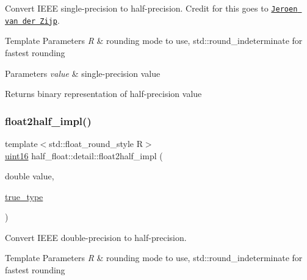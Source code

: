 Convert I\+E\+EE single-\/precision to half-\/precision. Credit for this goes to \href{ftp://ftp.fox-toolkit.org/pub/fasthalffloatconversion.pdf}{\tt Jeroen van der Zijp}. 
\begin{DoxyTemplParams}{Template Parameters}
{\em R} & rounding mode to use, {\ttfamily std\+::round\+\_\+indeterminate} for fastest rounding \\
\hline
\end{DoxyTemplParams}

\begin{DoxyParams}{Parameters}
{\em value} & single-\/precision value \\
\hline
\end{DoxyParams}
\begin{DoxyReturn}{Returns}
binary representation of half-\/precision value 
\end{DoxyReturn}
\mbox{\label{namespacehalf__float_1_1detail_a36dca5081e9a14c8e523d2415e476ace}} 
\subsubsection{\texorpdfstring{float2half\+\_\+impl()}{float2half\_impl()}\hspace{0.1cm}{\footnotesize\ttfamily [2/3]}}
{\footnotesize\ttfamily template$<$std\+::float\+\_\+round\+\_\+style R$>$ \\
\hyperlink{namespacehalf__float_1_1detail_a239ec58092b4e4849b444baee1a01088}{uint16} half\+\_\+float\+::detail\+::float2half\+\_\+impl (\begin{DoxyParamCaption}\item[{double}]{value,  }\item[{\hyperlink{namespacehalf__float_1_1detail_a5e245748a3cc20e348dd92383d99d03c}{true\+\_\+type}}]{ }\end{DoxyParamCaption})}

Convert I\+E\+EE double-\/precision to half-\/precision. 
\begin{DoxyTemplParams}{Template Parameters}
{\em R} & rounding mode to use, {\ttfamily std\+::round\+\_\+indeterminate} for fastest rounding \\
\hline
\end{DoxyTemplParams}

